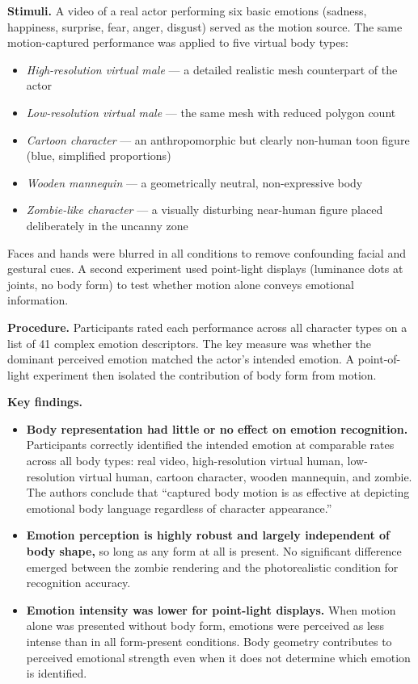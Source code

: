 \documentclass[11pt, a4paper]{article}
\begin{document}
\textbf{Stimuli.} A video of a real actor performing six basic emotions (sadness, happiness, surprise, fear, anger, disgust) served as the motion source. The same motion-captured performance was applied to five virtual body types:
\begin{itemize}[leftmargin=2em]
  \item \textit{High-resolution virtual male} --- a detailed realistic mesh counterpart of the actor
  \item \textit{Low-resolution virtual male} --- the same mesh with reduced polygon count
  \item \textit{Cartoon character} --- an anthropomorphic but clearly non-human toon figure (blue, simplified proportions)
  \item \textit{Wooden mannequin} --- a geometrically neutral, non-expressive body
  \item \textit{Zombie-like character} --- a visually disturbing near-human figure placed deliberately in the uncanny zone
\end{itemize}
Faces and hands were blurred in all conditions to remove confounding facial and gestural cues. A second experiment used point-light displays (luminance dots at joints, no body form) to test whether motion alone conveys emotional information.

\textbf{Procedure.} Participants rated each performance across all character types on a list of 41 complex emotion descriptors. The key measure was whether the dominant perceived emotion matched the actor's intended emotion. A point-of-light experiment then isolated the contribution of body form from motion.

\textbf{Key findings.}
\begin{itemize}[leftmargin=2em]
  \item \textbf{Body representation had little or no effect on emotion recognition.} Participants correctly identified the intended emotion at comparable rates across all body types: real video, high-resolution virtual human, low-resolution virtual human, cartoon character, wooden mannequin, and zombie. The authors conclude that ``captured body motion is as effective at depicting emotional body language regardless of character appearance.''
  \item \textbf{Emotion perception is highly robust and largely independent of body shape,} so long as any form at all is present. No significant difference emerged between the zombie rendering and the photorealistic condition for recognition accuracy.
  \item \textbf{Emotion intensity was lower for point-light displays.} When motion alone was presented without body form, emotions were perceived as less intense than in all form-present conditions. Body geometry contributes to perceived emotional strength even when it does not determine which emotion is identified.
\end{itemize}
\end{document}
